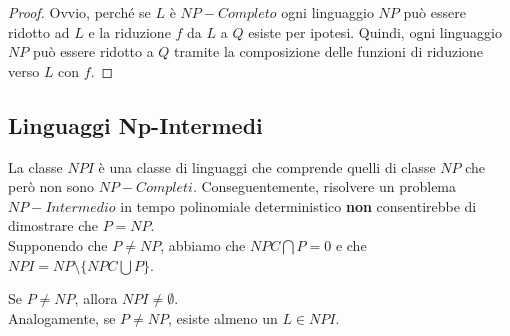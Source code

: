 \begin{proof}
	Ovvio, perché se $L$ è $NP-Completo$ ogni linguaggio $NP$ può essere ridotto ad $L$ e la riduzione $f$ da $L$ a $Q$ esiste per ipotesi. Quindi, ogni linguaggio $NP$ può essere ridotto a $Q$ tramite la composizione delle funzioni di riduzione verso $L$ con $f$.
\end{proof}

\subsection{Linguaggi Np-Intermedi}

La classe $NPI$ è una classe di linguaggi che comprende quelli di classe $NP$ che però non sono $NP-Completi$. Conseguentemente, risolvere un problema $NP-Intermedio$ in tempo polinomiale deterministico \textbf{non} consentirebbe di dimostrare che $P=NP$. \\

Supponendo che $P \neq NP$, abbiamo che $NPC \bigcap P = 0$ e che $NPI = NP \setminus \{NPC \bigcup P\}$. \\

\begin{lemm}
	Se $P \neq NP$, allora $NPI \neq \emptyset$. \\ Analogamente, se $P \neq NP$, esiste almeno un $L \in NPI$.
\end{lemm}
